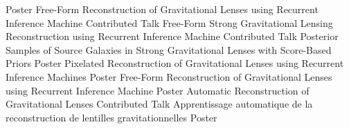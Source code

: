   {Poster}
  {Free-Form Reconstruction of Gravitational Lenses using Recurrent Inference Machine}
  {Contributed Talk}
  {Free-Form Strong Gravitational Lensing Reconstruction using Recurrent Inference Machine}
  {Contributed Talk}
  {Posterior Samples of Source Galaxies in Strong Gravitational Lenses with Score-Based Priors}
  {Poster}
  {Pixelated Reconstruction of Gravitational Lenses using Recurrent Inference Machines}
  {Poster}
  {Free-Form Reconstruction of Gravitational Lenses using Recurrent Inference Machine}
  {Poster}
  {Automatic Reconstruction of Gravitational Lenses}
  {Contributed Talk}
  {Apprentissage automatique de la reconstruction de lentilles gravitationnelles}
  {Poster}
